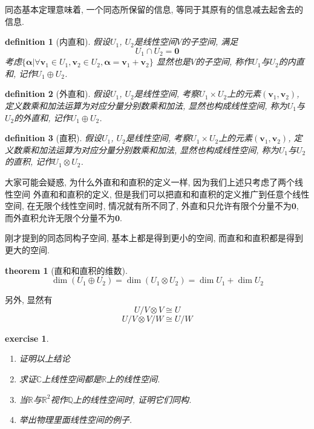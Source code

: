 \documentclass[12pt]{ctexbook}
\newtheorem{definition}{definition}
\numberwithin{definition}{section}
\newtheorem{theorem}{theorem}
\numberwithin{theorem}{section}
\newtheorem{exercise}{exercise}
\numberwithin{exercise}{section}
\numberwithin{example}{section}
\numberwithin{lemma}{section}
\begin{document}
    同态基本定理意味着, 一个同态所保留的信息, 等同于其原有的信息减去起舍去的信息.

    \begin{definition}
        [内直和] 假设\(U_1\), \(U_2\)是线性空间\(V\)的子空间, 满足
        \begin{equation}
            U_1 \cap U_2 = \boldsymbol{0}
        \end{equation}
        考虑\(\{\boldsymbol{\alpha} | \forall \boldsymbol{v}_1 \in U_1, \boldsymbol{v}_2 \in U_2, \boldsymbol{\alpha} = \boldsymbol{v}_1 + \boldsymbol{v}_2\}\)
        显然也是\(V\)的子空间, 称作\(U_1\)与\(U_2\)的内直和, 记作\(U_1 \oplus U_2\).
    \end{definition}

    \begin{definition}
        [外直和] 假设\(U_1\), \(U_2\)是线性空间,
        考察\(U_1 \times U_2\)\footnotemark{}上的元素\((\boldsymbol{v}_1, \boldsymbol{v}_2)\),
        定义数乘和加法运算为对应分量分别数乘和加法, 显然也构成线性空间, 称为\(U_1\)与\(U_2\)的外直和, 记作\(U_1 \oplus U_2\). 
    \end{definition}

    \begin{definition}
        [直积] 假设\(U_1\), \(U_2\)是线性空间,
        考察\(U_1 \times U_2\)上的元素\((\boldsymbol{v}_1, \boldsymbol{v}_2)\),
        定义数乘和加法运算为对应分量分别数乘和加法, 显然也构成线性空间, 称为\(U_1\)与\(U_2\)的直积, 记作\(U_1 \otimes U_2\). 
    \end{definition}

    大家可能会疑惑, 为什么外直和和直积的定义一样, 因为我们上述只考虑了两个线性空间
    外直和和直积的定义, 但是我们可以把直和和直积的定义推广到任意个线性空间, 在无限个线性空间时,
    情况就有所不同了, 外直和只允许有限个分量不为\(\boldsymbol{0}\), 而外直积允许无限个分量不为\(\boldsymbol{0}\).

    刚才提到的同态同构子空间, 基本上都是得到更小的空间, 而直和和直积都是得到更大的空间.

    \begin{theorem}
        [直和和直积的维数] 
        \begin{equation}
            \dim{(U_1 \oplus U_2)} = \dim{(U_1 \otimes U_2)} = \dim{U_1} + \dim{U_2}
        \end{equation}
    \end{theorem}

    另外, 显然有
    \begin{equation}
        U/V \otimes V \cong U
    \end{equation}
    \begin{equation}
        U/V \otimes V/W \cong U/W
    \end{equation}

    \begin{exercise}
        \begin{enumerate}
            \item 证明以上结论
            \item 求证\(\mathbb{C}\)上线性空间都是\(\mathbb{R}\)上的线性空间.
            \item 当\(\mathbb{R}\)与\(\mathbb{R}^2\)视作\(\mathbb{Q}\)上的线性空间时, 证明它们同构.
            \item 举出物理里面线性空间的例子.
        \end{enumerate}
    \end{exercise}
\end{document}
